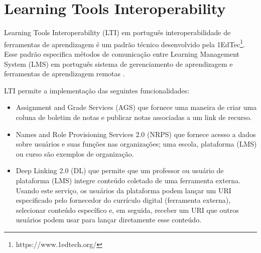 \section{Learning Tools Interoperability}
Learning Tools Interoperability (LTI) em português interoperabilidade de ferramentas de aprendizagem é um padrão técnico desenvolvido pela 1EdTec\footnote{https://www.1edtech.org/}. Esse padrão especifica métodos de comunicação entre Learning Management System (LMS) em português sistema de gerenciamento de aprendizagem e ferramentas de aprendizagem remotas \cite{1edtech}.

LTI permite a implementação das seguintes funcionalidades:
\begin{itemize}[label=$\sbullet$]
    \item Assignment and Grade Services (AGS) que fornece uma maneira de criar uma coluna de boletim de notas e publicar notas associadas a um link de recurso.
    \item Names and Role Provisioning Services 2.0 (NRPS) que fornece acesso a dados sobre usuários e suas funções nas organizações; uma escola, plataforma (LMS) ou curso são exemplos de organização.
    \item Deep Linking 2.0 (DL) que permite que um professor ou usuário de plataforma (LMS) integre conteúdo coletado de uma ferramenta externa. Usando este serviço, os usuários da plataforma podem lançar um URI especificado pelo fornecedor do currículo digital (ferramenta externa), selecionar conteúdo específico e, em seguida, receber um URI que outros usuários podem usar para lançar diretamente esse conteúdo.
\end{itemize}